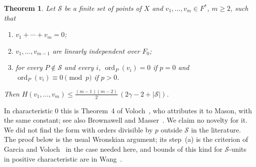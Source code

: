 \documentclass[11pt]{article}
\newtheorem{theorem}{Theorem}
\theoremstyle{definition}\newtheorem{definition}[theorem]{Definition}
\theoremstyle{remark}\newtheorem{remark}[theorem]{Remark}
\begin{document}
\begin{theorem}\label{thm:vanishing}
Let $\mathcal S$ be a finite set of points of $X$ and
$v_1,\ldots,v_m\in F^*$, $m\ge2$, such that
\begin{enumerate}
\item $v_1+\cdots+v_m=0$;
\item $v_1,\ldots,v_{m-1}$ are linearly independent over $F_0$;
\item for every $P\notin\mathcal S$ and every $i$,
 $\operatorname{ord}_P(v_i)=0$ if $p=0$ and
 $\operatorname{ord}_P(v_i)\equiv0\pmod p$ if $p>0$.
\end{enumerate}
Then $H(v_1,\ldots,v_m)\le\frac{(m-1)(m-2)}2\,(2\gamma-2+|\mathcal S|)$.
\end{theorem}
In characteristic $0$ this is Theorem~4 of Voloch~\cite{voloch85}, who
attributes it to Mason, with the same constant; see also Brownawell and
Masser~\cite{bm86}. We claim no novelty for it. We did not find the form
with orders divisible by $p$ outside $\mathcal S$ in the literature. The
proof below is the usual Wronskian argument; its step~(a) is the criterion
of Garcia and Voloch~\cite[Theorem~1]{gv87} in the case needed here, and
bounds of this kind for $\mathcal S$-units in positive characteristic are
in Wang~\cite{wang99}.
\end{document}
